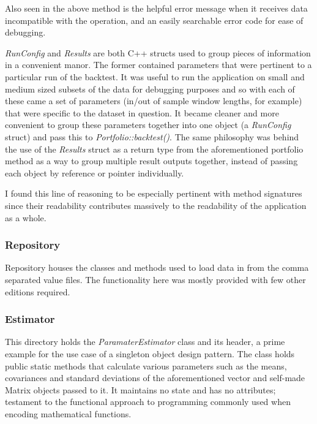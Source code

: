 \documentclass{article}
\begin{document}
Also seen in the above method is the helpful error message when it receives data incompatible with the operation, and an easily searchable error code for ease of debugging.


\textit{RunConfig}  and \textit{Results} are both C++ structs used to group pieces of information in a convenient manor. The former contained parameters that were pertinent to a particular run of the backtest. It was useful to run the application on small and medium sized subsets of the data for debugging purposes and so with each of these came a set of parameters (in/out of sample window lengths, for example) that were specific to the dataset in question. It became cleaner and more convenient to group these parameters together into one object (a \textit{RunConfig} struct) and pass this to \textit{Portfolio::backtest()}.  
The same philosophy was behind the use of the \textit{Results} struct as a return type from the aforementioned portfolio method as a way to group multiple result outputs together, instead of passing each object by reference or pointer individually. 

I found this line of reasoning to be especially pertinent with method signatures since their readability contributes massively to the readability of the application as a whole.  


\subsubsection{Repository}
\label{sec:repository}

Repository houses the classes and methods used to load data in from the comma separated value files. The functionality here was mostly provided with few other editions required.


\subsubsection{Estimator}
\label{sec:parameter_estimation}

This directory holds the \textit{ParamaterEstimator} class and its header, a prime example for the use case of a singleton object design pattern. The class holds public static methods that calculate various parameters such as the means, covariances and standard deviations of the aforementioned vector and self-made Matrix objects passed to it. It maintains no state and has no attributes; testament to the functional approach to programming commonly used when encoding mathematical functions.
\end{document}
